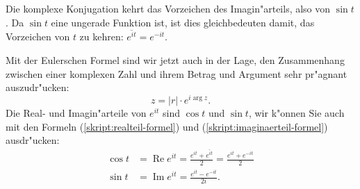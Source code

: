 Die komplexe Konjugation kehrt das Vorzeichen des Imagin"arteils, also 
von $\sin t$. Da $\sin t$ eine ungerade Funktion ist, ist dies gleichbedeuten
damit, das Vorzeichen von $t$ zu kehren: $\overline{e^{it}}=e^{-it}$.

Mit der Eulerschen Formel sind wir jetzt auch in der Lage, den Zusammenhang
zwischen einer komplexen Zahl und ihrem Betrag und Argument sehr pr"agnant
auszudr"ucken:
\[
z=|r|\cdot e^{i\operatorname{arg}z}.
\]
Die Real- und Imagin"arteile von $e^{it}$ sind $\cos t$ und $\sin t$,
wir k"onnen Sie auch mit den Formeln (\ref{skript:realteil-formel}) und
(\ref{skript:imaginaerteil-formel}) ausdr"ucken:
\begin{align*}
\cos t
&=
\operatorname{Re}e^{it}
=
\frac{e^{it}+\overline{e^{it}}}2
=
\frac{e^{it}+e^{-it}}2
\\
\sin t
&=
\operatorname{Im}e^{it}=\frac{e^{it}-e^{-it}}{2i}.
\end{align*}

